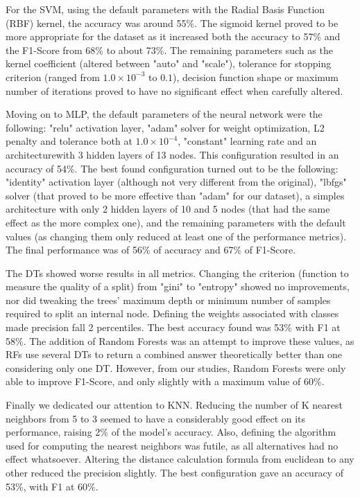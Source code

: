 \documentclass[extendedabs]{recpad2k}
\begin{document}
For the SVM, using the default parameters with the Radial Basis Function (RBF) kernel, the accuracy was around 55\%.
The sigmoid kernel proved to be more appropriate for the dataset as it increased both the accuracy to 57\% and the F1-Score from 68\% to about 73\%.
The remaining parameters such as the kernel coefficient (altered between "auto" and "scale"), tolerance for stopping criterion (ranged from $1.0 \times 10^{-3}$
to $0.1$), decision function shape or maximum number of iterations proved to have no significant effect when carefully altered.

Moving on to MLP, the default parameters of the neural network were the following:
"relu" activation layer, "adam" solver for weight optimization, L2 penalty and tolerance both at $1.0 \times 10^{-4}$, "constant" learning rate and an 
architecturewith 3 hidden layers of 13 nodes.
This configuration resulted in an accuracy of 54\%.
The best found configuration turned out to be the following: "identity" activation layer (although not very different from the original), "lbfgs" solver (that 
proved to be more effective than "adam" for our dataset), a simples architecture with only 2 hidden layers of 10 and 5 nodes (that had the same effect as the 
more complex one), and the remaining parameters with the default values (as changing them only reduced at least one of the performance metrics).
The final performance was of 56\% of accuracy and 67\% of F1-Score.

The DTs showed worse results in all metrics.
Changing the criterion (function to measure the quality of a split) from "gini" to "entropy" showed no improvements, nor did tweaking the trees' maximum depth 
or minimum number of samples required to split an internal node.
Defining the weights associated with classes made precision fall 2 percentiles.
The best accuracy found was 53\% with F1 at 58\%.
The addition of Random Forests was an attempt to improve these values, as RFs use several DTs to return a combined answer theoretically better than one 
considering only one DT.
However, from our studies, Random Forests were only able to improve F1-Score, and only slightly with a maximum value of 60\%.

Finally we dedicated our attention to KNN.
Reducing the number of K nearest neighbors from 5 to 3 seemed to have a considerably good effect on its performance, raising 2\% of the model's accuracy.
Also, defining the algorithm used for computing the nearest neighbors was futile, as all alternatives had no effect whatsoever.
Altering the distance calculation formula from euclidean to any other reduced the precision slightly.
The best configuration gave an accuracy of 53\%, with F1 at 60\%.
\end{document}

